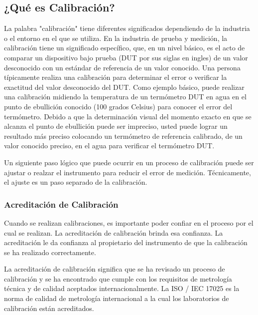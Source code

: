 \subsection{¿Qué es Calibración?}

\par 
La palabra "calibración" tiene diferentes significados dependiendo de la industria o el entorno en el que se utiliza. En la industria de prueba y medición, la calibración tiene un significado específico, que, en un nivel básico, es el acto de comparar un dispositivo bajo prueba (DUT por sus siglas en ingles) de un valor desconocido con un estándar de referencia de un valor conocido. Una persona típicamente realiza una calibración para determinar el error o verificar la exactitud del valor desconocido del DUT. Como ejemplo básico, puede realizar una calibración midiendo la temperatura de un termómetro DUT en agua en el punto de ebullición conocido (100 grados Celsius) para conocer el error del termómetro. Debido a que la determinación visual del momento exacto en que se alcanza el punto de ebullición puede ser impreciso, usted puede lograr un resultado más preciso colocando un termómetro de referencia calibrado, de un valor conocido preciso, en el agua para verificar el termómetro DUT\cite{calibracion-fluke}.

\par \noindent
Un siguiente paso lógico que puede ocurrir en un proceso de calibración puede ser ajustar o realzar el instrumento para reducir el error de medición. Técnicamente, el ajuste es un paso separado de la calibración\cite{calibracion-fluke}.

\subsubsection{Acreditación de Calibración }

\par 
Cuando se realizan calibraciones, es importante poder confiar en el proceso por el cual se realizan. La acreditación de calibración brinda esa confianza. La acreditación le da confianza al propietario del instrumento de que la calibración se ha realizado correctamente.\cite{calibracion-fluke}

\par \noindent
La acreditación de calibración significa que se ha revisado un proceso de calibración y se ha encontrado que cumple con los requisitos de metrología técnica y de calidad aceptados internacionalmente. La ISO / IEC 17025 es la norma de calidad de metrología internacional a la cual los laboratorios de calibración están acreditados.\cite{calibracion-fluke}

